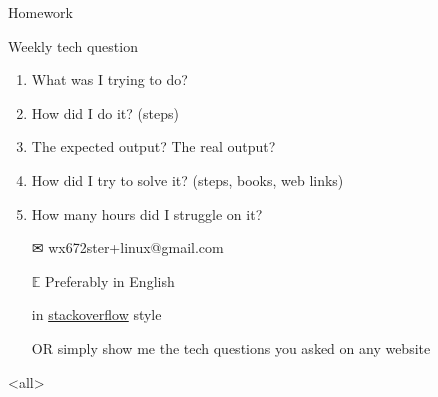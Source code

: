 \begin{frame}{{\hw\enspace}Homework}
  \begin{block}{Weekly tech question}
    \begin{enumerate}
    \item What was I trying to do?
    \item How did I do it? (steps)
    \item The expected output? The real output?
    \item How did I try to solve it? (steps, books, web links)
    \item How many hours did I struggle on it?
    \end{enumerate}
  \end{block}
  \begin{itemize}
  \item[\Large\dejavu ✉] \alert{\ttfamily wx672ster+linux@gmail.com}
  \item[$\mathbb{E}$] Preferably in English
  \item[\stackoverflow] in
    \href{https://stackoverflow.com/questions/39199299/what-is-the-essential-difference-between-compound-command-and-normal-command-inlink}{stackoverflow}
    style
  \item[OR] simply show me the tech questions you asked on any website
  \end{itemize}  
\end{frame}

\mode<all>

